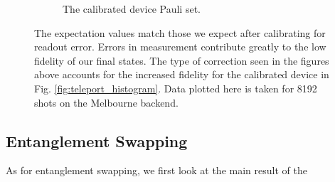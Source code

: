 \begin{figure}[h!]
\begin{subfigure}{.5\textwidth}
    \caption{The calibrated device Pauli set.}
    \label{fig:tele_pauli_dev}
  \end{subfigure}
  \caption{The expectation values match those we expect after calibrating for
readout error. Errors in measurement contribute greatly to the low fidelity of
our final states. The type of correction seen in the figures above accounts for
the increased fidelity for the calibrated device in Fig.
\ref{fig:teleport_histogram}. Data plotted here is taken for 8192 shots on the
Melbourne backend.}
  \label{fig:tele_paulis}
\end{figure}


\subsection{Entanglement Swapping}
As for entanglement swapping, we first look at the main result of the


